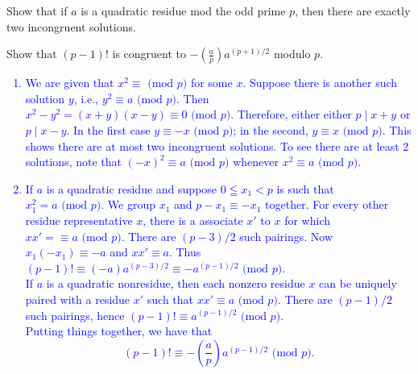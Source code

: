 \documentclass[a4paper,11pt]{article}
\theoremstyle{mythm}
\theoremstyle{mydef}
\newcommand{\blue}[1]{\textcolor{blue}{#1}}
\renewcommand{\pmod}[1]{\text{ (mod $#1$)}}
\begin{document}
\begin{enumerate*}[{\bf (a)}]
\item Show that if $a$ is a quadratic residue mod the odd prime $p$, then there
  are exactly two incongruent solutions.
\item Show that $(p-1)!$ is congruent to $-\left( \frac{a}{p}
  \right)a^{(p+1)/2}$ modulo $p$.
\end{enumerate*}

\blue{
  \begin{enumerate}[{\bf (a)}]
  \item We are given that $x^2 \equiv \pmod{p}$ for some $x$. Suppose there is
    another such solution $y$, i.e., $y^2 \equiv a \pmod{p}$. Then
    $x^2-y^2=(x+y)(x-y) \equiv 0 \pmod{p}$. Therefore, either either $p \mid
    x+y$ or $p \mid x-y$. In the first case $y \equiv -x \pmod{p}$; in the
    second, $y \equiv x \pmod{p}$. This shows there are at most two incongruent
    solutions. To see there are at least 2 solutions, note that $(-x)^2 \equiv a
    \pmod{p}$ whenever $x^2 \equiv a \pmod{p}$.
  \item If $a$ is a quadratic residue and suppose $0 \leqq x_1 < p$ is such that
    $x_1^2 = a \pmod{p}$. We group $x_1$ and $p-x_1 \equiv -x_1$ together. For
    every other residue representative $x$, there is a associate $x'$ to $x$ for
    which $xx' = \equiv a \pmod{p}$. There are $(p-3)/2$ such pairings. Now
    $x_1(-x_1) \equiv -a$ and $xx' \equiv a$. Thus $(p-1)! \equiv
    (-a)a^{(p-3)/2} \equiv -a^{(p-1)/2} \pmod{p}$. \\
    If $a$ is a quadratic nonresidue, then each nonzero residue $x$ can be
    uniquely paired with a residue $x'$ such that $xx' \equiv a \pmod{p}$. There
    are $(p-1)/2$ such pairings, hence $(p-1)! \equiv a^{(p-1)/2} \pmod{p}$. \\
    Putting things together, we have that
    \[
      (p-1)! \equiv -\left( \frac{a}{p} \right)a^{(p-1)/2} \pmod{p}.
    \]
  \end{enumerate}
}
\end{document}
